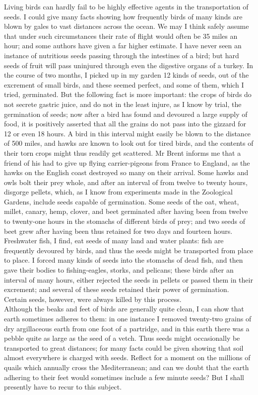 \indent Living birds can hardly fail to be highly effective agents in the transportation of seeds. I could give many facts showing how frequently birds of many kinds are blown by gales to vast distances across the ocean. We may I think safely assume that under such circumstances their rate of flight would often be 35 miles an hour; and some authors have given a far higher estimate. I have never seen an instance of nutritious seeds passing through the intestines of a bird; but hard seeds of fruit will pass uninjured through even the digestive organs of a turkey. In the course of two months, I picked up in my garden 12 kinds of seeds, out of the excrement of small birds, and these seemed perfect, and some of them, which I tried, germinated. But the following fact is more important: the crops of birds do not secrete gastric juice, and do not in the least injure, as I know by trial, the germination of seeds; now after a bird has found and devoured a large supply of food, it is positively asserted that all the grains do not pass into the gizzard for 12 or even 18 hours. A bird in this interval might easily be blown to the distance of 500 miles, and hawks are known to look out for tired birds, and the contents of their torn crops might thus readily get scattered. Mr Brent informs me that a friend of his had to give up flying carrier-pigeons from France to England, as the hawks on the English coast destroyed so many on their arrival. Some hawks and owls bolt their prey whole, and after an interval of from twelve to twenty hours, disgorge pellets, which, as I know from experiments made in the Zoological Gardens, include seeds capable of germination.  Some seeds of the oat, wheat, millet, canary, hemp, clover, and beet germinated after having been from twelve to twenty-one hours in the stomachs of different birds of prey; and two seeds of beet grew after having been thus retained for two days and fourteen hours.  Freshwater fish, I find, eat seeds of many land and water plants: fish are frequently devoured by birds, and thus the seeds might be transported from place to place. I forced many kinds of seeds into the stomachs of dead fish, and then gave their bodies to fishing-eagles, storks, and pelicans; these birds after an interval of many hours, either rejected the seeds in pellets or passed them in their excrement; and several of these seeds retained their power of germination. Certain seeds, however, were always killed by this process.~\\
\indent Although the beaks and feet of birds are generally quite clean, I can show that earth sometimes adheres to them: in one instance I removed twenty-two grains of dry argillaceous earth from one foot of a partridge, and in this earth there was a pebble quite as large as the seed of a vetch. Thus seeds might occasionally be transported to great distances; for many facts could be given showing that soil almost everywhere is charged with seeds. Reflect for a moment on the millions of quails which annually cross the Mediterranean; and can we doubt that the earth adhering to their feet would sometimes include a few minute seeds? But I shall presently have to recur to this subject.~\\
